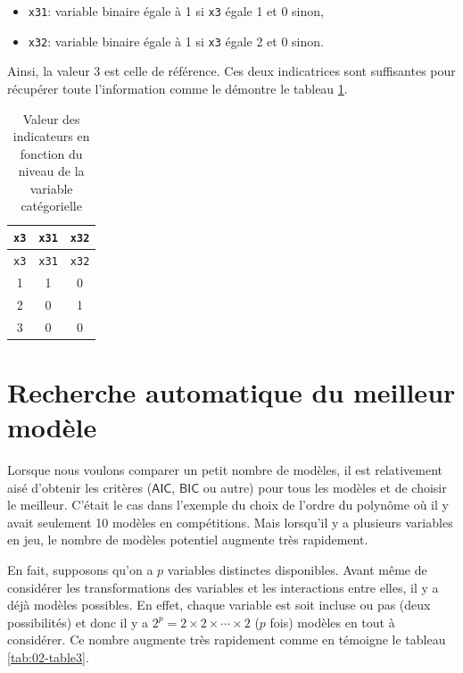 \documentclass[
  11pt,
  letterpaper,
]{book}
\providecommand{\tightlist}{%
  \setlength{\itemsep}{0pt}\setlength{\parskip}{0pt}}
\theoremstyle{definition}
\theoremstyle{definition}
\theoremstyle{definition}
\theoremstyle{remark}
\begin{document}
\begin{itemize}
\tightlist
\item
  \texttt{x31}: variable binaire égale à 1 si \texttt{x3} égale 1 et 0 sinon,
\item
  \texttt{x32}: variable binaire égale à 1 si \texttt{x3} égale 2 et 0 sinon.
\end{itemize}

Ainsi, la valeur 3 est celle de référence. Ces deux indicatrices sont suffisantes pour récupérer toute l'information comme le démontre le tableau \ref{tab:02-dummy}.

\begin{longtable}[]{@{}ccc@{}}
\caption{\label{tab:02-dummy} Valeur des indicateurs en fonction du niveau de la variable catégorielle}\tabularnewline
\toprule
\texttt{x3} & \texttt{x31} & \texttt{x32} \\
\midrule
\endfirsthead
\toprule
\texttt{x3} & \texttt{x31} & \texttt{x32} \\
\midrule
\endhead
1 & 1 & 0 \\
2 & 0 & 1 \\
3 & 0 & 0 \\
\bottomrule
\end{longtable}

\hypertarget{recherche-automatique-du-meilleur-moduxe8le}{%
\section{Recherche automatique du meilleur modèle}\label{recherche-automatique-du-meilleur-moduxe8le}}

Lorsque nous voulons comparer un petit nombre de modèles, il est relativement aisé d'obtenir les critères (\(\mathsf{AIC}\), \(\mathsf{BIC}\) ou autre) pour tous les modèles et de choisir le meilleur. C'était le cas dans l'exemple du choix de l'ordre du polynôme où il y avait seulement 10 modèles en compétitions.
Mais lorsqu'il y a plusieurs variables en jeu, le nombre de modèles potentiel augmente très rapidement.

En fait, supposons qu'on a \(p\) variables distinctes disponibles. Avant même de considérer les transformations des variables et les interactions entre elles, il y a déjà modèles possibles. En effet, chaque variable est soit incluse ou pas (deux possibilités) et donc il y a \(2^p=2\times 2 \times \cdots \times 2\) (\(p\) fois) modèles en tout à considérer. Ce nombre augmente très rapidement comme en témoigne le tableau \ref{tab:02-table3}.
\end{document}
